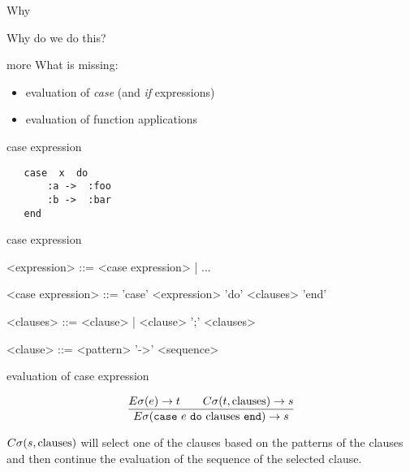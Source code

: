 \begin{frame}{Why}

\vspace{40pt}\hspace{80pt}Why do we do this?

\end{frame}


\begin{frame}{more}
What is missing:
\pause
\begin{itemize}
  \item evaluation of {\em case} (and {\em if} expressions)
  \item evaluation of function applications
\end{itemize}
\end{frame}

\begin{frame}[fragile]{case expression}

\begin{verbatim}
   case  x  do
       :a ->  :foo
       :b ->  :bar
   end
\end{verbatim}

\end{frame}

\begin{frame}{case expression}

\begin{grammar}
     <expression> ::=  <case expression> | ...  

     <case expression> ::= 'case' <expression> 'do' <clauses>  'end' 

     <clauses> ::=   <clause> | <clause> ';' <clauses>

     <clause> ::=  <pattern> '->' <sequence>
\end{grammar}
\end{frame}

\begin{frame}{evaluation of case expression}


$$\frac{E\sigma(e) \rightarrow t \qquad C\sigma(t, {\rm clauses}) \rightarrow s }{E\sigma({\tt case}\ e \ {\tt do}\ {\rm clauses} \ {\tt end}) \rightarrow s}$$
  


 \vspace{20pt}\pause $C\sigma(s, {\rm clauses})$ will select one of
 the clauses based on the patterns of the clauses and then continue the
 evaluation of the sequence of the selected clause.
\end{frame}

